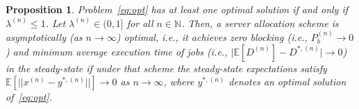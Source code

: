 \documentclass[a4paper]{article}
\theoremstyle{plain}
\newtheorem{proposition}{Proposition}
\newtheorem{remark}{Remark}
\theoremstyle{definition}
\theoremstyle{case}
\theoremstyle{remark}
\newcommand{\E}{\mathbb{E}}
\newcommand{\sbrac}[1]{\left[#1\right]}
\newcommand{\expect}[1]{\mathbb{E}\sbrac{#1}}
\newcommand{\abs}[1]{\lvert #1 \rvert}
\begin{document}
\begin{proposition}  
\label{proposition: optimality}
Problem~\eqref{eq:opt} has at least one optimal solution if and only if $\lambda^{(n)} \leq 1$. 
%
Let $\lambda^{(n)} \in (0,1]$ for all $n \in \mathbb{N}$. Then, a server allocation scheme is asymptotically (as $n \to \infty$) optimal, i.e., it achieves zero blocking (i.e., $P_b^{(n)} \to 0$) and minimum average execution time of jobs (i.e., $\abs{\E[D^{(n)}]-D^{*,(n)}} \to 0$) in the steady-state if under that scheme the steady-state expectations satisfy $\mathbb{E}[\vert \vert x^{(n)}-y^{*,(n)}\vert\vert] \to 0$ as $n \to \infty$, where $y^{*,(n)}$ denotes an optimal solution of~\eqref{eq:opt}. 
\end{proposition}
%
%
%
\end{document}
